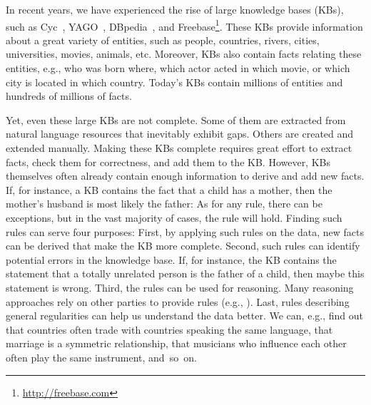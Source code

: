 
In recent years, we have experienced the rise of large knowledge bases (KBs), such as Cyc~\cite{cyc}, YAGO~\cite{SucKasWei07}, DBpedia~\cite{dbpedia}, and Freebase\footnote{\label{freebase}\url{http://freebase.com}}.
These KBs provide information about a great variety of entities, such as people, countries, rivers, cities, universities, movies, animals, etc. 
Moreover, KBs also contain facts relating these entities, e.g., 
who was born where, which actor acted in which movie, or which city is located in which country. Today's KBs contain millions of entities and hundreds of millions of facts. 

Yet, even these large KBs are not complete. Some of them are extracted from natural language resources that inevitably exhibit gaps. Others are created and extended manually. Making these KBs complete requires great effort to extract facts, check them for correctness, and add them to the KB. 
However, KBs themselves often already contain enough information to derive and add new facts. If, for instance, a KB contains the fact that a child has a mother, then the mother's husband is most likely the father: 
As for any rule, there can be exceptions, but in the vast majority of cases, the rule will hold. Finding such rules can serve four purposes: First, by applying such rules on the data, new facts can be derived that make the KB more complete. 
Second, such rules can identify potential errors in the knowledge base. If, for instance, the KB contains the statement that a totally unrelated person is the father of a child, then maybe this statement is wrong. 
Third, the rules can be used for reasoning. Many reasoning approaches rely on other parties to provide rules (e.g., \cite{markovlogic,urdf}). 
Last, rules describing general regularities can help us understand the data better. We can, e.g., find out that countries often trade with countries speaking the same language, that marriage is a symmetric relationship, that musicians who influence each other often play the same instrument, and~so~on. 


